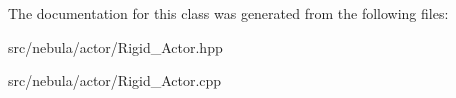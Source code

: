 \-The documentation for this class was generated from the following files\-:\begin{DoxyCompactItemize}
\item 
src/nebula/actor/\-Rigid\-\_\-\-Actor.\-hpp\item 
src/nebula/actor/\-Rigid\-\_\-\-Actor.\-cpp\end{DoxyCompactItemize}
